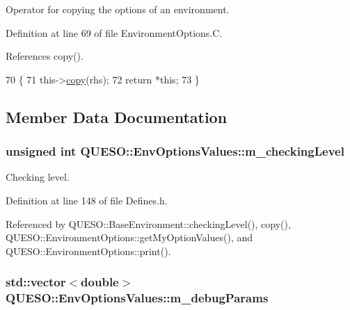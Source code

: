 Operator for copying the options of an environment. 



Definition at line 69 of file Environment\-Options.\-C.



References copy().


\begin{DoxyCode}
70 \{
71   this->\hyperlink{class_q_u_e_s_o_1_1_env_options_values_a894118967a4d4a7e8d649124df853f25}{copy}(rhs);
72   \textcolor{keywordflow}{return} *\textcolor{keyword}{this};
73 \}
\end{DoxyCode}


\subsection{Member Data Documentation}
\hypertarget{class_q_u_e_s_o_1_1_env_options_values_a8c6ef31adcc7909b75a83cf30e698b7d}{
\subsubsection[{m\-\_\-checking\-Level}]{\setlength{\rightskip}{0pt plus 5cm}unsigned int Q\-U\-E\-S\-O\-::\-Env\-Options\-Values\-::m\-\_\-checking\-Level}}\label{class_q_u_e_s_o_1_1_env_options_values_a8c6ef31adcc7909b75a83cf30e698b7d}


Checking level. 



Definition at line 148 of file Defines.\-h.



Referenced by Q\-U\-E\-S\-O\-::\-Base\-Environment\-::checking\-Level(), copy(), Q\-U\-E\-S\-O\-::\-Environment\-Options\-::get\-My\-Option\-Values(), and Q\-U\-E\-S\-O\-::\-Environment\-Options\-::print().

\hypertarget{class_q_u_e_s_o_1_1_env_options_values_aef18abb5a1cf76c527b03342e2c2e8b1}{
\subsubsection[{m\-\_\-debug\-Params}]{\setlength{\rightskip}{0pt plus 5cm}std\-::vector$<$double$>$ Q\-U\-E\-S\-O\-::\-Env\-Options\-Values\-::m\-\_\-debug\-Params}}\label{class_q_u_e_s_o_1_1_env_options_values_aef18abb5a1cf76c527b03342e2c2e8b1}


